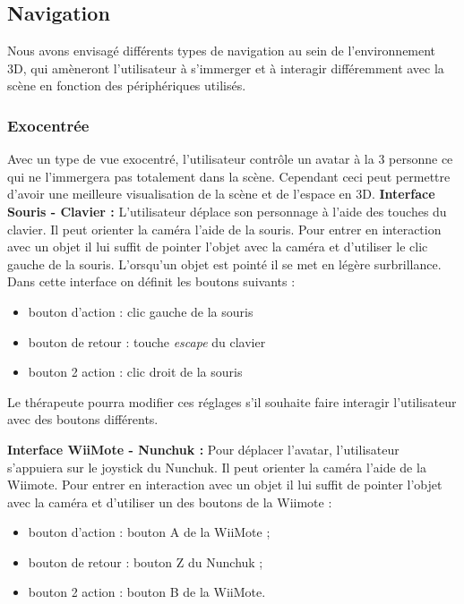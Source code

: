 \subsection{Navigation}
Nous avons envisagé différents types de navigation au sein de l'environnement 3D, qui amèneront l'utilisateur à s'immerger et à interagir différemment avec la scène en fonction des périphériques utilisés.

\subsubsection{Exocentrée}
Avec un type de vue exocentré, l'utilisateur contrôle un avatar à la 3 personne ce qui ne l'immergera pas totalement dans la scène. Cependant ceci peut permettre d'avoir une meilleure visualisation de la scène et de l'espace en 3D.
\newline
\textbf{Interface Souris - Clavier : }
L'utilisateur déplace son personnage à l'aide des touches du clavier. Il peut orienter la caméra l'aide de la souris. Pour entrer en interaction avec un objet il lui suffit de pointer l'objet avec la caméra et d'utiliser le clic gauche de la souris. L'orsqu'un objet est pointé il se met en légère surbrillance.
Dans cette interface on définit les boutons suivants :
\begin{itemize}
	\item bouton d'action : clic gauche de la souris
	\item bouton de retour : touche {\em escape} du clavier
	\item  bouton 2 action : clic droit de la souris
\end{itemize}
Le thérapeute pourra modifier ces réglages s'il souhaite faire interagir l'utilisateur avec des boutons différents.
\newline


\textbf{Interface WiiMote - Nunchuk : }
Pour déplacer l'avatar, l'utilisateur s'appuiera sur le joystick du Nunchuk. Il peut orienter la caméra l'aide de la Wiimote. Pour entrer en interaction avec un objet il lui suffit de pointer l'objet avec la caméra et d'utiliser un des boutons de la Wiimote :
	\begin{itemize}\renewcommand{\labelitemi}{$\bullet$}
  				\item bouton d'action : bouton A de la WiiMote ;
				 \item bouton de retour : bouton Z du Nunchuk ;
  				\item  bouton 2 action : bouton B de la WiiMote.
			\end{itemize}

